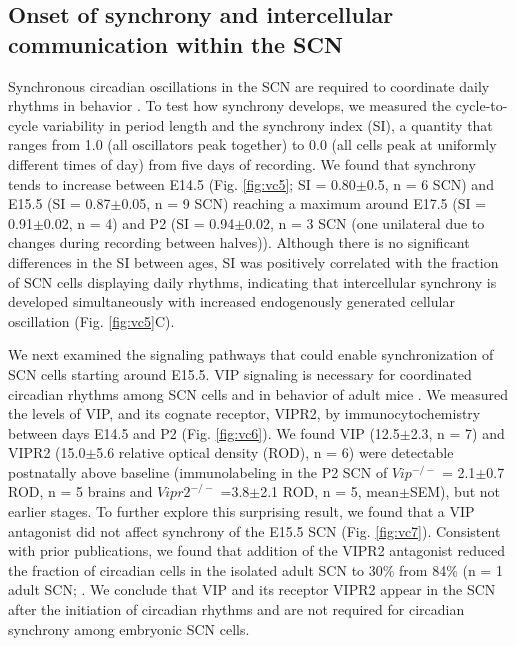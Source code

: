 \subsection*{Onset of synchrony and intercellular communication within the SCN}

Synchronous circadian oscillations in the SCN are required to coordinate daily rhythms in behavior \cite{Schwartz1987, Aton2005, Ohta2005}.
To test how synchrony develops, we measured the cycle-to-cycle variability in period length and the synchrony index (SI), a quantity that ranges from 1.0 (all oscillators peak together) to 0.0 (all cells peak at uniformly different times of day) from five days of recording.
We found that synchrony tends to increase between E14.5 (Fig. 
\ref{fig:vc5}; SI = 0.80$\pm$0.5, n = 6 SCN) and E15.5 (SI = 0.87$\pm$0.05, n = 9 SCN) reaching a maximum around E17.5 (SI = 0.91$\pm$0.02, n = 4) and P2 (SI = 0.94$\pm$0.02, n = 3 SCN (one unilateral due to changes during recording between halves)). 
Although there is no significant differences in the SI between ages, SI was positively correlated with the fraction of SCN cells displaying daily rhythms, indicating that intercellular synchrony is developed simultaneously with increased endogenously generated cellular oscillation (Fig. 
\ref{fig:vc5}C). 



We next examined the signaling pathways that could enable synchronization of SCN cells starting around E15.5.
VIP signaling is necessary for coordinated circadian rhythms among SCN cells and in behavior of adult mice \cite{Harmar2002, Colwell2003, Aton2005, Maywood2006, Ciarleglio2009}.
We measured the levels of VIP, and its cognate receptor, VIPR2, by immunocytochemistry between days E14.5 and P2 (Fig. 
\ref{fig:vc6}).
We found VIP (12.5$\pm$2.3, n = 7) and VIPR2 (15.0$\pm$5.6 relative optical density (ROD), n = 6) were detectable postnatally above baseline (immunolabeling in the P2 SCN of $Vip^{-/-}$ = 2.1$\pm$0.7 ROD, n = 5 brains and $Vipr2^{-/-}$ =3.8$\pm$2.1 ROD, n = 5, mean$\pm$SEM), but not earlier stages.
To further explore this surprising result, we found that a VIP antagonist did not affect synchrony of the E15.5 SCN (Fig. 
\ref{fig:vc7}).
Consistent with prior publications, we found that addition of the VIPR2 antagonist reduced the fraction of circadian cells in the isolated adult SCN to 30\% from 84\% (n = 1 adult SCN; \cite{Cutler2003, Aton2005}.
We conclude that VIP and its receptor VIPR2 appear in the SCN after the initiation of circadian rhythms and are not required for circadian synchrony among embryonic SCN cells.

